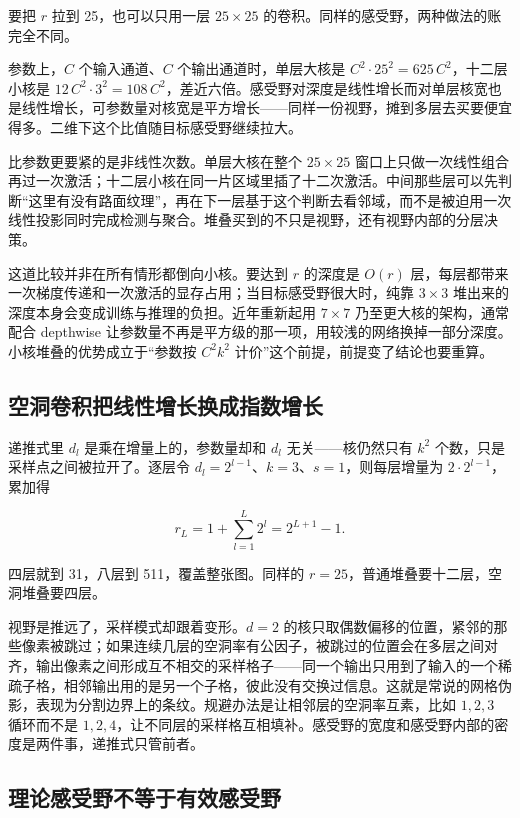 要把 \(r\) 拉到 25，也可以只用一层 \(25\times25\) 的卷积。同样的感受野，两种做法的账完全不同。

参数上，\(C\) 个输入通道、\(C\) 个输出通道时，单层大核是 \(C^2\cdot 25^2=625\,C^2\)，十二层小核是 \(12\,C^2\cdot 3^2=108\,C^2\)，差近六倍。感受野对深度是线性增长而对单层核宽也是线性增长，可参数量对核宽是平方增长——同样一份视野，摊到多层去买要便宜得多。二维下这个比值随目标感受野继续拉大。

比参数更要紧的是非线性次数。单层大核在整个 \(25\times25\) 窗口上只做一次线性组合再过一次激活；十二层小核在同一片区域里插了十二次激活。中间那些层可以先判断``这里有没有路面纹理''，再在下一层基于这个判断去看邻域，而不是被迫用一次线性投影同时完成检测与聚合。堆叠买到的不只是视野，还有视野内部的分层决策。

这道比较并非在所有情形都倒向小核。要达到 \(r\) 的深度是 \(O(r)\) 层，每层都带来一次梯度传递和一次激活的显存占用；当目标感受野很大时，纯靠 \(3\times3\) 堆出来的深度本身会变成训练与推理的负担。近年重新起用 \(7\times7\) 乃至更大核的架构，通常配合 depthwise 让参数量不再是平方级的那一项，用较浅的网络换掉一部分深度。小核堆叠的优势成立于``参数按 \(C^2k^2\) 计价''这个前提，前提变了结论也要重算。

\subsection{空洞卷积把线性增长换成指数增长}

递推式里 \(d_l\) 是乘在增量上的，参数量却和 \(d_l\) 无关——核仍然只有 \(k^2\) 个数，只是采样点之间被拉开了。逐层令 \(d_l=2^{l-1}\)、\(k=3\)、\(s=1\)，则每层增量为 \(2\cdot 2^{l-1}\)，累加得

\[
r_L = 1 + \sum_{l=1}^{L} 2^{l} = 2^{L+1}-1 .
\]

四层就到 31，八层到 511，覆盖整张图。同样的 \(r=25\)，普通堆叠要十二层，空洞堆叠要四层。

视野是推远了，采样模式却跟着变形。\(d=2\) 的核只取偶数偏移的位置，紧邻的那些像素被跳过；如果连续几层的空洞率有公因子，被跳过的位置会在多层之间对齐，输出像素之间形成互不相交的采样格子——同一个输出只用到了输入的一个稀疏子格，相邻输出用的是另一个子格，彼此没有交换过信息。这就是常说的网格伪影，表现为分割边界上的条纹。规避办法是让相邻层的空洞率互素，比如 \(1,2,3\) 循环而不是 \(1,2,4\)，让不同层的采样格互相填补。感受野的宽度和感受野内部的密度是两件事，递推式只管前者。

\subsection{理论感受野不等于有效感受野}

